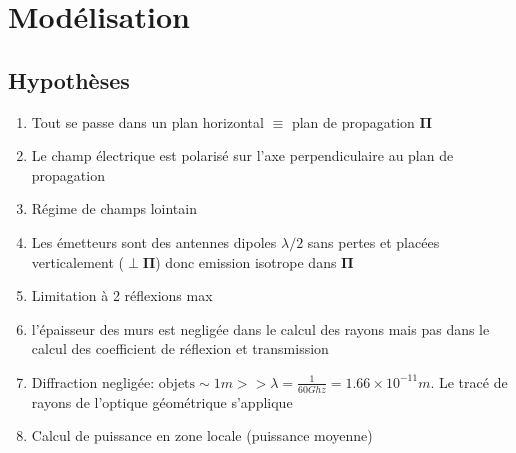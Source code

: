 \documentclass[sn-mathphys-num]{sn-jnl}%
\theoremstyle{thmstyleone}%
\theoremstyle{thmstyletwo}%
\theoremstyle{thmstylethree}%
\begin{document}




\section{Modélisation}
    \subsection{Hypothèses}
    \begin{enumerate}
        \item Tout se passe dans un plan horizontal $\equiv$ plan de propagation $\mathbf{\Pi}$
        \item Le champ électrique est polarisé sur l'axe perpendiculaire au plan de propagation
        \item Régime de champs lointain 
        \item \label{dipole} Les émetteurs sont des antennes dipoles $\lambda/2$ sans pertes
        et placées verticalement ($\perp \mathbf{\Pi}$) donc emission isotrope dans $\mathbf{\Pi}$
        \item Limitation à 2 réflexions max
        \item l'épaisseur des murs est negligée dans le calcul des rayons mais pas
        dans le calcul des coefficient de réflexion et transmission
        \item Diffraction negligée: $\text{objets} \sim 1m >> \lambda = \frac{1}{60Ghz} = 1.66 \times 10^{-11}m$. 
        Le tracé de rayons de l'optique géométrique s'applique
        \item Calcul de puissance en zone locale (puissance moyenne)
    \end{enumerate}
\end{document}
